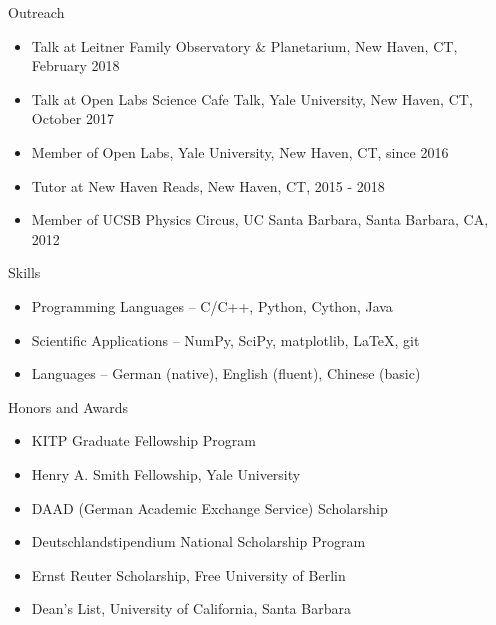 \documentclass[11pt]{resume} %
\begin{document}
\begin{rSection}{Outreach}
  \begin{itemize}[leftmargin=1.0cm, topsep=0pt,itemsep=0pt,partopsep=0pt, parsep=0pt]
    \item Talk at Leitner Family Observatory \& Planetarium, New Haven, CT, February 2018
    \item Talk at Open Labs Science Cafe Talk, Yale University, New Haven, CT, October 2017
    \item Member of Open Labs, Yale University, New Haven, CT, since 2016
    \item Tutor at New Haven Reads, New Haven, CT, 2015 - 2018
    \item Member of UCSB Physics Circus, UC Santa Barbara, Santa Barbara, CA, 2012
  \end{itemize}
\end{rSection}

\begin{rSection}{Skills}
  \begin{itemize}[leftmargin=1.0cm, topsep=0pt,itemsep=0pt,partopsep=0pt, parsep=0pt]
    \item Programming Languages – C/C++, Python, Cython, Java
    \item Scientific Applications – NumPy, SciPy, matplotlib, LaTeX, git
    \item Languages – German (native), English (fluent), Chinese (basic)
  \end{itemize}
\end{rSection}

\begin{rSection}{Honors and Awards}
  \begin{itemize}[leftmargin=1.0cm, topsep=0pt,itemsep=0pt,partopsep=0pt, parsep=0pt]
    \item KITP Graduate Fellowship Program
    \item Henry A. Smith Fellowship, Yale University
    \item DAAD (German Academic Exchange Service) Scholarship
    \item Deutschlandstipendium National Scholarship Program
    \item Ernst Reuter Scholarship, Free University of Berlin
    \item Dean's List, University of California, Santa Barbara
  \end{itemize}
\end{rSection}
\end{document}
